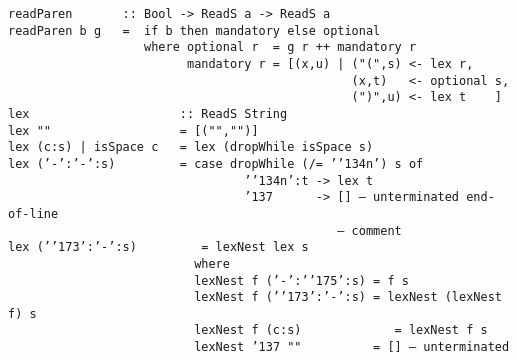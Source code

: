 %
\eprogB\noindent\bprogB
\mbox{\tt readParen\ \ \ \ \ \ \ ::\ Bool\ ->\ ReadS\ a\ ->\ ReadS\ a}\\
\mbox{\tt readParen\ b\ g\ \ \ =\ \ if\ b\ then\ mandatory\ else\ optional}\\
\mbox{\tt \ \ \ \ \ \ \ \ \ \ \ \ \ \ \ \ \ \ \ where\ optional\ r\ \ =\ g\ r\ ++\ mandatory\ r}\\
\mbox{\tt \ \ \ \ \ \ \ \ \ \ \ \ \ \ \ \ \ \ \ \ \ \ \ \ \ mandatory\ r\ =\ [(x,u)\ |\ ("(",s)\ <-\ lex\ r,}\\
\mbox{\tt \ \ \ \ \ \ \ \ \ \ \ \ \ \ \ \ \ \ \ \ \ \ \ \ \ \ \ \ \ \ \ \ \ \ \ \ \ \ \ \ \ \ \ \ \ \ \ \ (x,t)\ \ \ <-\ optional\ s,}\\
\mbox{\tt \ \ \ \ \ \ \ \ \ \ \ \ \ \ \ \ \ \ \ \ \ \ \ \ \ \ \ \ \ \ \ \ \ \ \ \ \ \ \ \ \ \ \ \ \ \ \ \ (")",u)\ <-\ lex\ t\ \ \ \ ]}
%
\eprogB\noindent\bprogB
\mbox{\tt lex\ \ \ \ \ \ \ \ \ \ \ \ \ \ \ \ \ \ \ \ \ ::\ ReadS\ String}\\
\mbox{\tt lex\ ""\ \ \ \ \ \ \ \ \ \ \ \ \ \ \ \ \ \ =\ [("","")]}\\
\mbox{\tt lex\ (c:s)\ |\ isSpace\ c\ \ \ =\ lex\ (dropWhile\ isSpace\ s)}\\
\mbox{\tt lex\ ('-':'-':s)\ \ \ \ \ \ \ \ \ =\ case\ dropWhile\ (/=\ '{\char'134}n')\ s\ of}\\
\mbox{\tt \ \ \ \ \ \ \ \ \ \ \ \ \ \ \ \ \ \ \ \ \ \ \ \ \ \ \ \ \ \ \ \ \ '{\char'134}n':t\ ->\ lex\ t}\\
\mbox{\tt \ \ \ \ \ \ \ \ \ \ \ \ \ \ \ \ \ \ \ \ \ \ \ \ \ \ \ \ \ \ \ \ \ {\char'137}\ \ \ \ \ \ ->\ []\ --\ unterminated\ end-of-line}\\
\mbox{\tt \ \ \ \ \ \ \ \ \ \ \ \ \ \ \ \ \ \ \ \ \ \ \ \ \ \ \ \ \ \ \ \ \ \ \ \ \ \ \ \ \ \ \ \ \ \ --\ comment}
%
\eprogB\noindent\bprogB
\mbox{\tt lex\ ('{\char'173}':'-':s)\ \ \ \ \ \ \ \ \ =\ lexNest\ lex\ s}\\
\mbox{\tt \ \ \ \ \ \ \ \ \ \ \ \ \ \ \ \ \ \ \ \ \ \ \ \ \ \ where}\\
\mbox{\tt \ \ \ \ \ \ \ \ \ \ \ \ \ \ \ \ \ \ \ \ \ \ \ \ \ \ lexNest\ f\ ('-':'{\char'175}':s)\ =\ f\ s}\\
\mbox{\tt \ \ \ \ \ \ \ \ \ \ \ \ \ \ \ \ \ \ \ \ \ \ \ \ \ \ lexNest\ f\ ('{\char'173}':'-':s)\ =\ lexNest\ (lexNest\ f)\ s}\\
\mbox{\tt \ \ \ \ \ \ \ \ \ \ \ \ \ \ \ \ \ \ \ \ \ \ \ \ \ \ lexNest\ f\ (c:s)\ \ \ \ \ \ \ \ \ \ \ \ \ =\ lexNest\ f\ s}\\
\mbox{\tt \ \ \ \ \ \ \ \ \ \ \ \ \ \ \ \ \ \ \ \ \ \ \ \ \ \ lexNest\ {\char'137}\ ""\ \ \ \ \ \ \ \ \ \ =\ []\ --\ unterminated}\\
